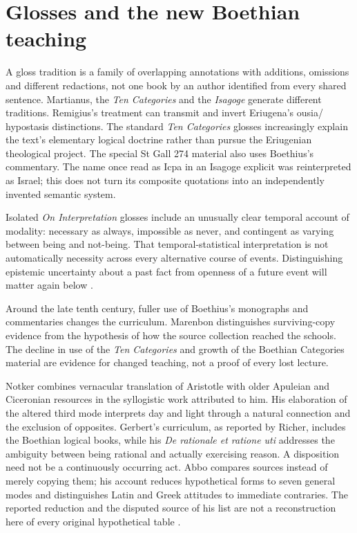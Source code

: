 \section{Glosses and the new Boethian teaching}
\label{sec:p13-early-latin-glosses}

A gloss tradition is a family of overlapping annotations with additions,
omissions and different redactions, not one book by an author identified
from every shared sentence. Martianus, the \emph{Ten Categories} and
the \emph{Isagoge} generate different traditions.
Remigius's treatment can transmit and invert Eriugena's ousia/
hypostasis distinctions. The standard \emph{Ten Categories} glosses
increasingly explain the text's elementary logical doctrine rather
than pursue the Eriugenian theological project.
The special St Gall 274 material also uses Boethius's commentary.
The name once read as Icpa in an Isagoge explicit was reinterpreted
as Israel; this does not turn its composite quotations into an
independently invented semantic system.

Isolated \emph{On Interpretation} glosses include an unusually clear
temporal account of modality: necessary as always, impossible as
never, and contingent as varying between being and not-being.
That temporal-statistical interpretation is not automatically
necessity across every alternative course of events.
Distinguishing epistemic uncertainty about a past fact from openness
of a future event will matter again below
\cite[pp.~34--37]{Marenbon2007FordhamEarlyLatin}.

Around the late tenth century, fuller use of Boethius's monographs
and commentaries changes the curriculum. Marenbon distinguishes
surviving-copy evidence from the hypothesis of how the source
collection reached the schools. The decline in use of the
\emph{Ten Categories} and growth of the Boethian Categories material
are evidence for changed teaching, not a proof of every lost lecture.

Notker combines vernacular translation of Aristotle with older
Apuleian and Ciceronian resources in the syllogistic work attributed
to him. His elaboration of the altered third mode interprets
day and light through a natural connection and the exclusion of
opposites. Gerbert's curriculum, as reported by Richer, includes
the Boethian logical books, while his \emph{De rationale et ratione uti}
addresses the ambiguity between being rational and actually exercising
reason. A disposition need not be a continuously occurring act.
Abbo compares sources instead of merely copying them; his account
reduces hypothetical forms to seven general modes and distinguishes
Latin and Greek attitudes to immediate contraries.
The reported reduction and the disputed source of his list are
not a reconstruction here of every original hypothetical table
\cite[pp.~38--42]{Marenbon2007FordhamEarlyLatin}.

